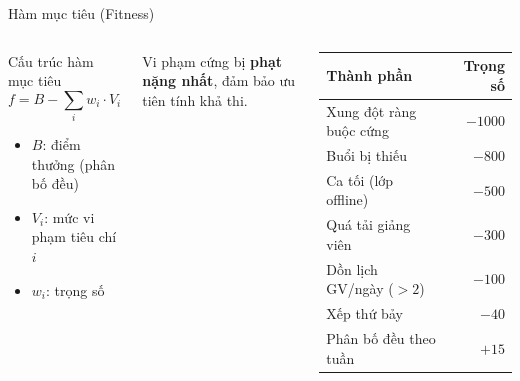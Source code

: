 \documentclass[aspectratio=169,10pt]{beamer}
\begin{document}
\begin{frame}{Hàm mục tiêu (Fitness)}
\begin{columns}[T]
\begin{block}{Cấu trúc hàm mục tiêu}
$$f = B - \sum_{i} w_i \cdot V_i$$
\begin{itemize}\setlength{\itemsep}{2pt}
  \item $B$: điểm thưởng (phân bố đều)
  \item $V_i$: mức vi phạm tiêu chí $i$
  \item $w_i$: trọng số
\end{itemize}
\end{block}
Vi phạm cứng bị \textbf{phạt nặng nhất}, đảm bảo ưu tiên tính khả thi.

\begin{table}
\centering
\footnotesize
\begin{tabular}{@{}lr@{}}
\toprule
\textbf{Thành phần} & \textbf{Trọng số} \\
\midrule
Xung đột ràng buộc cứng & $-1000$ \\
Buổi bị thiếu & $-800$ \\
Ca tối (lớp offline) & $-500$ \\
Quá tải giảng viên & $-300$ \\
Dồn lịch GV/ngày ($>2$) & $-100$ \\
Xếp thứ bảy & $-40$ \\
Phân bố đều theo tuần & $+15$ \\
\bottomrule
\end{tabular}
\end{table}
\end{columns}
\end{frame}
\end{document}
